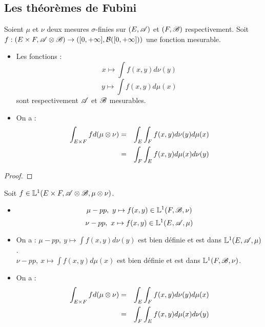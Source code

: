 \subsection{Les théorèmes de Fubini}

\begin{theorem}
	Soient $\mu$ et $\nu$ deux mesures $\sigma$-finies sur $(E, \mathscr{A})$ et $(F, \mathscr{B})$ respectivement.
	Soit $f: (E \times F, \mathscr{A} \otimes \mathscr{B}) \to ([0, +\infty], \mathcal{B}([0, +\infty]))$ une fonction mesurable.

	\begin{itemize}
		\item Les fonctions :
		      $$ x \mapsto \int f(x, y) d \nu(y)$$
		      $$ y \mapsto \int f(x, y) d \mu(x)$$
		      sont respectivement $\mathscr{A}$ et $\mathscr{B}$ mesurables.
		\item On a :
		      \begin{eqnarray*}
			      \int_{E \times F} f d(\mu \otimes \nu) & = & \int_E  \int_F f(x, y) d \nu(y) d \mu(x) \\
			      & = & \int_F  \int_E f(x, y) d \mu(x) d \nu(y)
		      \end{eqnarray*}
	\end{itemize}
\end{theorem}


\begin{proof}
\end{proof}


\begin{theorem}
	Soit $f \in \mathbb{L}^1(E \times F, \mathscr{A} \otimes \mathscr{B}, \mu \otimes \nu)$.

	\begin{itemize}
		\item $$ \mu-pp, \ y \mapsto f(x, y) \in \mathbb{L}^1(F, \mathscr{B}, \nu)$$
		      $$ \nu-pp, \ x \mapsto f(x, y) \in \mathbb{L}^1(E, \mathscr{A}, \mu)$$
		\item On a :
		      $\mu-pp, \ y \mapsto \int f(x, y) d \nu(y)$ est bien définie et est dans $\mathbb{L}^1(E, \mathscr{A}, \mu)$.\\
		      $\nu-pp, \ x \mapsto \int f(x, y) d \mu(x)$ est bien définie et est dans $\mathbb{L}^1(F, \mathscr{B}, \nu)$.
		\item On a :
		      \begin{eqnarray*}
			      \int_{E \times F} f d(\mu \otimes \nu) & = & \int_E  \int_F f(x, y) d \nu(y) d \mu(x) \\
			      & = & \int_F  \int_E f(x, y) d \mu(x) d \nu(y)
		      \end{eqnarray*}
	\end{itemize}
\end{theorem}


